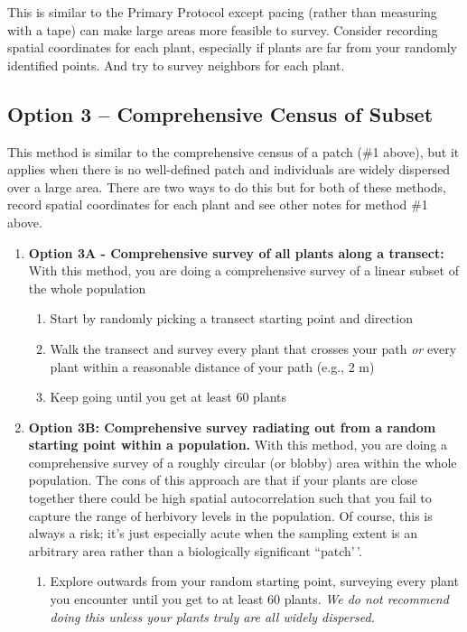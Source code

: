 \documentclass[
  letterpaper,
  oneside,
  open=any]{scrbook}
\providecommand{\tightlist}{%
  \setlength{\itemsep}{0pt}\setlength{\parskip}{0pt}}\usepackage{longtable,booktabs,array}
\begin{document}
This is similar to the Primary Protocol except pacing (rather than
measuring with a tape) can make large areas more feasible to survey.
Consider recording spatial coordinates for each plant, especially if
plants are far from your randomly identified points. And try to survey
neighbors for each plant.

\subsection{Option 3 -- Comprehensive Census of
Subset}\label{option-3-comprehensive-census-of-subset}

This method is similar to the comprehensive census of a patch (\#1
above), but it applies when there is no well-defined patch and
individuals are widely dispersed over a large area. There are two ways
to do this but for both of these methods, record spatial coordinates for
each plant and see other notes for method \#1 above.

\begin{enumerate}
\def\labelenumi{\arabic{enumi}.}
\item
  \textbf{Option 3A - Comprehensive survey of all plants along a
  transect: }With this method, you are doing a comprehensive survey of a
  linear subset of the whole population

  \begin{enumerate}
  \def\labelenumii{\alph{enumii}.}
  \item
    Start by randomly picking a transect starting point and direction
  \item
    Walk the transect and survey every plant that crosses your path
    \emph{or} every plant within a reasonable distance of your path
    (e.g., 2 m)
  \item
    Keep going until you get at least 60 plants
  \end{enumerate}
\item
  \textbf{Option 3B: Comprehensive survey radiating out from a random
  starting point within a population. } With this method, you are doing
  a comprehensive survey of a roughly circular (or blobby) area within
  the whole population. The cons of this approach are that if your
  plants are close together there could be high spatial autocorrelation
  such that you fail to capture the range of herbivory levels in the
  population. Of course, this is always a risk; it's just especially
  acute when the sampling extent is an arbitrary area rather than a
  biologically significant ``patch'\,'.

  \begin{enumerate}
  \def\labelenumii{\alph{enumii}.}
  \tightlist
  \item
    Explore outwards from your random starting point, surveying every
    plant you encounter until you get to at least 60 plants. \emph{We do
    not recommend doing this unless your plants truly are all widely
    dispersed.}
  \end{enumerate}
\end{enumerate}
\end{document}
